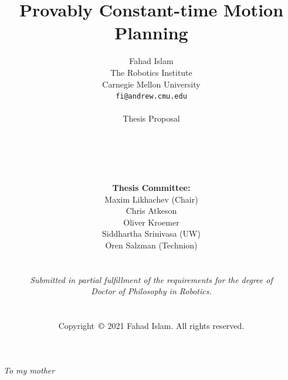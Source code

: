 \documentclass[a4paper]{report}
\title{Provably Constant-time Motion Planning}
\author{Fahad Islam\\
The Robotics Institute\\
Carnegie Mellon University\\
\texttt{fi@andrew.cmu.edu}
\\
\\
\Large{Thesis Proposal}\\
\\
\\
\\
\\
\\
\vspace{2mm}
\textbf{Thesis Committee:}\\
Maxim Likhachev (Chair)\\
Chris Atkeson\\
Oliver Kroemer\\
Siddhartha Srinivasa (UW)\\
Oren Salzman (Technion)\\
\\
\\
\textit{Submitted in partial fulfillment of the requirements
for the degree of}\\
\textit{Doctor of Philosophy in Robotics.}\\
\\
\\
Copyright~$\copyright$ 2021 Fahad Islam. All rights reserved.
}
\begin{document}
\maketitle

%
%
%
%

\newpage
\begin{center}
\textit{To my mother}
\end{center}
\newpage
\end{document}
